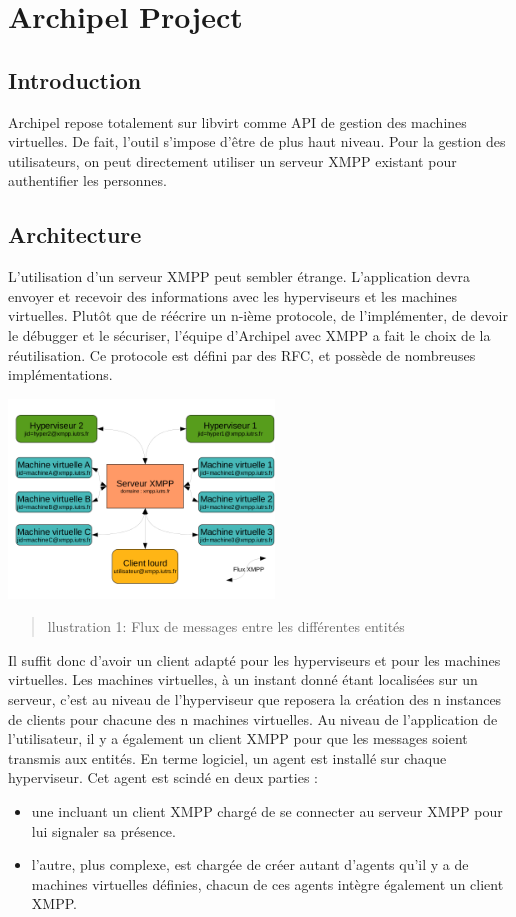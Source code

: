   \chapter{Archipel Project}
    \section{Introduction}
Archipel repose totalement sur libvirt comme API de gestion des machines virtuelles. De fait, l'outil s'impose d'être de plus haut niveau. Pour la gestion des utilisateurs, on peut directement utiliser un serveur XMPP existant pour authentifier les personnes.

    \section{Architecture}
L'utilisation d'un serveur XMPP peut sembler étrange. L'application devra envoyer et recevoir des informations avec les hyperviseurs et les machines virtuelles. Plutôt que de réécrire un n-ième protocole, de l'implémenter, de devoir le débugger et le sécuriser, l'équipe d'Archipel avec XMPP a fait le choix de la réutilisation. Ce protocole est défini par des RFC, et possède de nombreuses implémentations.
\begin{center}
\includegraphics[width=200pt]{images/archi_archipel.png}
\begin{quote}llustration 1: Flux de messages entre les différentes entités\end{quote}
\end{center}

Il suffit donc d'avoir un client adapté pour les hyperviseurs et pour les machines virtuelles. Les machines virtuelles, à un instant donné étant localisées sur un serveur, c'est au niveau de l'hyperviseur que
reposera la création des n instances de clients pour chacune des n machines virtuelles. Au niveau de l'application de l'utilisateur, il y a également un client XMPP pour que les messages soient transmis aux
entités.\newline
En terme logiciel, un agent est installé sur chaque hyperviseur. Cet agent est scindé en deux parties :\newline
\begin{itemize}
 \item une incluant un client XMPP chargé de se connecter au serveur XMPP pour lui signaler sa présence.
 \item l'autre, plus complexe, est chargée de créer autant d'agents qu'il y a de machines
 virtuelles définies, chacun de ces agents intègre également un client XMPP.\newline
\end{itemize}


